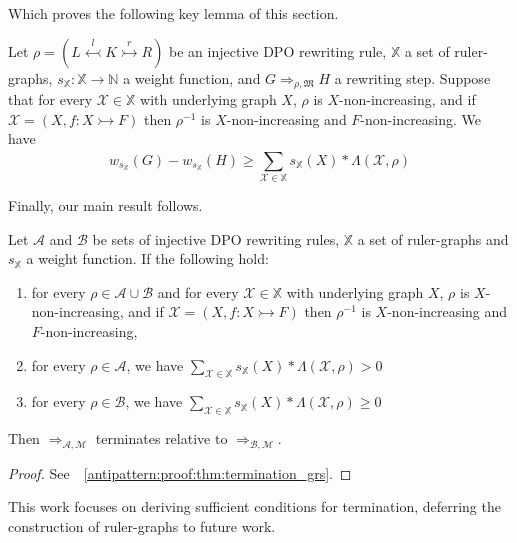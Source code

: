 Which proves the following key lemma of this section.
\begin{lemma}
    \label{antipattern:lem:w_g_geq_w_h_leq}
    Let $\rho = (L \overset{l}{\leftarrowtail} K \overset{r}{\rightarrowtail} R)$ be an injective DPO rewriting rule,
    \( \mathbb{X} \) a set of ruler-graphs,
    \( s_{\mathbb{X}} \colon \mathbb{X} \to \mathbb{N} \) a weight function,
    and \( G \Rightarrow_{\rho,\mathfrak{M}} H \) a rewriting step. 
    Suppose that for every \( \mathcal{X} \in \mathbb{X} \) with underlying graph $X$, 
    $\rho$ is $X$-non-increasing, and if $\mathcal{X}= (X,f:X \rightarrowtail F)$ then $\rho^{-1}$ is $X$-non-increasing and $F$-non-increasing. We have
     $$
        w_{s_\mathbb{X}}(G) - w_{s_\mathbb{X}}(H) 
        \geq 
        \sum_{\mathcal{X} \in \mathbb{X}}^{}s_\mathbb{X}(X) * \Lambda(\mathcal{X},\rho)
    $$
\end{lemma}
Finally, our main result follows.
\begin{theorem}[Termination] 
    \label{antipattern:thm:termination_grs} 
    Let \(\mathcal{A}\) and \(\mathcal{B}\) be sets of injective DPO rewriting rules, $\mathbb{X}$ a set of ruler-graphs and $s_\mathbb{X}$ a weight function. If the following hold:
    \begin{enumerate}
        \item  for every $\rho \in \mathcal{A} \cup \mathcal{B}$ and for every \( \mathcal{X} \in \mathbb{X} \) with underlying graph $X$, 
        $\rho$ is $X$-non-increasing, and if $\mathcal{X}= (X,f:X \rightarrowtail F)$ then $\rho^{-1}$ is $X$-non-increasing and $F$-non-increasing,
        \item for every \(\rho \in \mathcal{A}\), we have
        $ \sum_{\mathcal{X} \in \mathbb{X}}^{}s_\mathbb{X}(X) * 
            \Lambda(\mathcal{X},\rho) > 0 $
        \item for every \(\rho \in \mathcal{B}\), we have   
        $ 
            \sum_{\mathcal{X} \in \mathbb{X}}^{}s_\mathbb{X}(X) * \Lambda(\mathcal{X},\rho) \geq 0 
        $
    \end{enumerate}
    Then \(\Rightarrow_{\mathcal{A},\mathcal{M}}\) terminates relative to \(\Rightarrow_{\mathcal{B},\mathcal{M}}\).
\end{theorem}
\begin{proof}
    See~\textsection~\ref{antipattern:proof:thm:termination_grs}.
\end{proof}
\begin{remark}
    This work focuses on deriving sufficient conditions for termination, deferring the construction of ruler-graphs to future work.
\end{remark} 